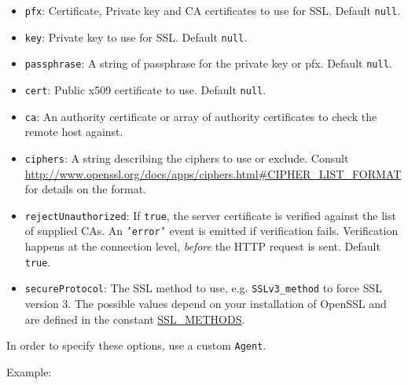 \begin{itemize}
\itemsep1pt\parskip0pt
\item
  \texttt{pfx}: Certificate, Private key and CA certificates to use for
  SSL. Default \texttt{null}.
\item
  \texttt{key}: Private key to use for SSL. Default \texttt{null}.
\item
  \texttt{passphrase}: A string of passphrase for the private key or
  pfx. Default \texttt{null}.
\item
  \texttt{cert}: Public x509 certificate to use. Default \texttt{null}.
\item
  \texttt{ca}: An authority certificate or array of authority
  certificates to check the remote host against.
\item
  \texttt{ciphers}: A string describing the ciphers to use or exclude.
  Consult
  \url{http://www.openssl.org/docs/apps/ciphers.html\#CIPHER_LIST_FORMAT}
  for details on the format.
\item
  \texttt{rejectUnauthorized}: If \texttt{true}, the server certificate
  is verified against the list of supplied CAs. An \texttt{'error'}
  event is emitted if verification fails. Verification happens at the
  connection level, \emph{before} the HTTP request is sent. Default
  \texttt{true}.
\item
  \texttt{secureProtocol}: The SSL method to use, e.g.
  \texttt{SSLv3\_method} to force SSL version 3. The possible values
  depend on your installation of OpenSSL and are defined in the constant
  \href{http://www.openssl.org/docs/ssl/ssl.html\#DEALING_WITH_PROTOCOL_METHODS}{SSL\_METHODS}.
\end{itemize}

In order to specify these options, use a custom \texttt{Agent}.

Example:

\begin{Shaded}
\begin{Highlighting}[]
 
  \NormalTok{: }\NormalTok{,}
  \NormalTok{: }\NormalTok{,}
  \NormalTok{: }\NormalTok{,}
  \NormalTok{: }\NormalTok{,}
  \NormalTok{: }\NormalTok{(}\NormalTok{),}
  \NormalTok{: }\NormalTok{(}\NormalTok{)}
\NormalTok{\};}
 \NormalTok{= } 

 
\NormalTok{\}}
\end{Highlighting}
\end{Shaded}

